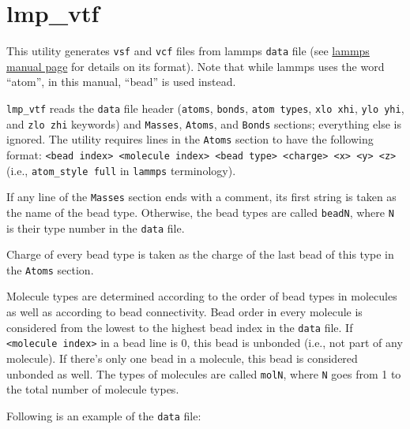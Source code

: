\section{lmp\_vtf} \label{sec:lmp_vtf}

This utility generates \texttt{vsf} and \texttt{vcf} files from lammps
\texttt{data} file (see
\href{https://lammps.sandia.gov/doc/read_data.html}{lammps manual page} for
details on its format). Note that while lammps uses the word
\enquote{atom}, in this manual, \enquote{bead} is used instead.

\texttt{lmp\_vtf} reads the \texttt{data} file header (\texttt{atoms},
\texttt{bonds}, \texttt{atom types}, \texttt{xlo xhi}, \texttt{ylo yhi},
and \texttt{zlo zhi} keywords) and \texttt{Masses}, \texttt{Atoms}, and
\texttt{Bonds} sections; everything else is ignored. The utility requires
lines in the \texttt{Atoms} section to have the following format:
\texttt{<bead index> <molecule index> <bead type> <charge> <x> <y> <z>} (i.e.,
\texttt{atom\_style full} in \texttt{lammps} terminology).

If any line of the \texttt{Masses} section ends with a comment, its first
string is taken as the name of the bead type. Otherwise, the bead types are
called \texttt{beadN}, where \texttt{N} is their type number in the
\texttt{data} file.

Charge of every bead type is taken as the charge of the last bead of this
type in the \texttt{Atoms} section.

Molecule types are determined according to the order of bead types in
molecules as well as according to bead connectivity. Bead order in every
molecule is considered from the lowest to the highest bead index in the
\texttt{data} file. If \texttt{<molecule index>} in a bead line is 0, this
bead is unbonded (i.e., not part of any molecule). If there's only one bead
in a molecule, this bead is considered unbonded as well. The types of
molecules are called \texttt{molN}, where \texttt{N} goes from 1 to the
total number of molecule types.

Following is an example of the \texttt{data} file:

